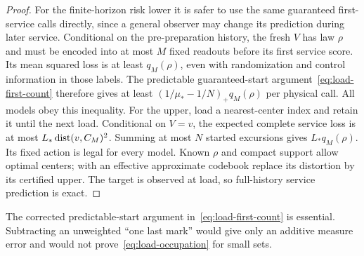 \begin{proof}
For the finite-horizon risk lower it is safer to use the same guaranteed first-service calls directly, since a general observer may change its prediction during later service. Conditional on the pre-preparation history, the fresh $V$ has law $\rho$ and must be encoded into at most $M$ fixed readouts before its first service score. Its mean squared loss is at least $q_M(\rho)$, even with randomization and control information in those labels. The predictable guaranteed-start argument~\eqref{eq:load-first-count} therefore gives at least $(1/\mu_*-1/N)_+q_M(\rho)$ per physical call. All models obey this inequality. For the upper, load a nearest-center index and retain it until the next load. Conditional on $V=v$, the expected complete service loss is at most $L_*\operatorname{dist}(v,C_M)^2$. Summing at most $N$ started excursions gives $L_*q_M(\rho)$. Its fixed action is legal for every model. Known $\rho$ and compact support allow optimal centers; with an effective approximate codebook replace its distortion by its certified upper. The target is observed at load, so full-history service prediction is exact.
\end{proof}

The corrected predictable-start argument in~\eqref{eq:load-first-count} is essential. Subtracting an unweighted ``one last mark'' would give only an additive measure error and would not prove~\eqref{eq:load-occupation} for small sets.

